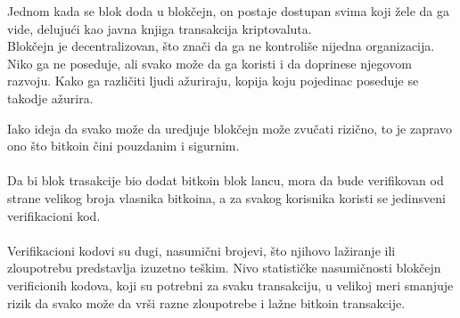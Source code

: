 \documentclass[a4paper]{article}
\begin{document}
\begin{table}[h!]

\begin{center}
\caption{Struktura blokova u blokčejnu.}

\captionsetup[subfloat]{labelformat=empty}
\quad
{}
\quad
{}

\label{tab:tabela_blok}
\end{center}
\end{table}

Jednom kada se blok doda u blokčejn, on postaje dostupan svima koji žele da ga vide, delujući kao javna knjiga transakcija kriptovaluta.
\\
Blokčejn je decentralizovan, što znači da ga ne kontroliše nijedna organizacija. Niko ga ne poseduje, ali svako može da ga koristi i da doprinese njegovom razvoju. Kako ga različiti ljudi ažuriraju, kopija koju pojedinac poseduje se takodje ažurira.

Iako ideja da svako može da uredjuje blokčejn može zvučati rizično, to je zapravo ono što bitkoin čini pouzdanim i sigurnim.
\\
\\
Da bi blok trasakcije bio dodat bitkoin blok lancu, mora da bude verifikovan od strane velikog broja vlasnika bitkoina, a za svakog korisnika koristi se jedinsveni verifikacioni kod.
\\
\\
Verifikacioni kodovi su dugi, nasumični brojevi, što njihovo lažiranje ili zloupotrebu predstavlja izuzetno teškim. Nivo statističke nasumičnosti blokčejn verificionih kodova, koji su potrebni za svaku transakciju, u velikoj meri smanjuje rizik da svako može da vrši razne zloupotrebe i lažne bitkoin transakcije.
\end{document}
